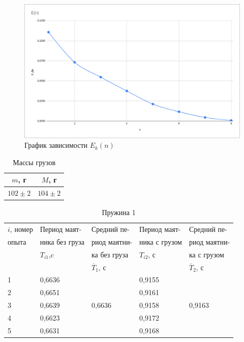\documentclass[12pt]{article}
\begin{document}
\begin{figure}[h!]
	\includegraphics[scale=0.45]{graph3}
	\caption{График зависимости $E_k(n)$}
\end{figure}
\begin{table}[h!]
	\centering
	\begin{tabular}{|c|c|}
		\hline
		$m$, г&$M$, г\\ \hline 
		$102\pm{2}$&$104\pm{2}$\\
		\hline
	\end{tabular}
\caption{Массы грузов}
\end{table}
\begin{table}[h!]
	\begin{tabular}{|l|l|l|l|l|}
		\hline
		$i$, номер & Период маят-   & Средний пе-  & Период маят-          & Средний пе-  \\
		опыта    & ника без груза & риод маятни- & ника с грузом         & риод маятни- \\
		& $T_{i1}$,c           & ка без груза & $T_{i2}$, с                & ка с грузом  \\
		&                & $\overline{T}_1$, с        & \multicolumn{1}{c|}{} & $\overline{T}_2$, с        \\ \hline
		1        & 0,6636         &              & 0,9155                &              \\ \cline{1-2} \cline{4-4}
		2        & 0,6651         &              & 0,9161                &              \\ \cline{1-2} \cline{4-4}
		3        & 0,6639         & 0,6636       & 0,9158                & 0,9163       \\ \cline{1-2} \cline{4-4}
		4        & 0,6623         &              & 0,9172                &              \\ \cline{1-2} \cline{4-4}
		5        & 0,6631         &              & 0,9168                &              \\ \hline
	\end{tabular}
\caption{Пружина 1}
\end{table}
\end{document}
